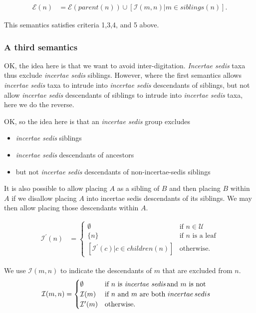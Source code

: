 \documentclass[english]{article}
\begin{document}
\begin{align*} 
\mathcal{E}(n) & =\mathcal{E}(parent(n))\cup\left[\mathcal{I}(m,n)\big|m\in siblings(n)\right].\label{eq:exclude-set-formula-1}
\end{align*}

This semantics satisfies criteria 1,3,4, and 5 above.

\subsubsection{A third semantics}

OK, the idea here is that we want to avoid inter-digitation.
\emph{Incertae sedis} taxa thus exclude\emph{ incertae sedis}
siblings. However, where the first semantics allows \emph{incertae
sedis }taxa to intrude into \emph{incertae sedis} descendants of
siblings, but not allow\emph{ incertae sedis} descendants of siblings
to intrude into \emph{incertae sedis} taxa, here we do the reverse.

OK, so the idea here is that an\emph{ incertae sedis} group excludes
\begin{itemize} \item \emph{incertae sedis} siblings \item
\emph{incertae sedis }descendants of ancestors \item but not\emph{
incertae sedis} descendants of non-incertae-sedis siblings
\end{itemize} It is also possible to allow placing $A$ as a sibling of
$B$ and then placing $B$ within $A$ if we disallow placing $A$ into
incertae sedis descendants of its siblings. We may then allow placing
those descendants within $A$.

\begin{align*} \mathcal{I^{\prime}}(n) & =\begin{cases} \emptyset &
\text{if }n\in\mathcal{U}\\ \{n\} & \text{if }n\text{ is a leaf}\\{}
[\mathcal{I}^{\prime}(c)|c\in children(n)] & \text{otherwise.}
\end{cases} \end{align*}

We use $\mathcal{I}(m,n)$ to indicate the descendants of $m$ that are
excluded from $n$. \begin{align*} \mathcal{I}(m,n) & =\begin{cases}
\emptyset & \text{if }n\text{ is \emph{incertae sedis}\,and }m\text{
is not}\\ \mathcal{I}(m) & \text{if }n\text{ and }m\text{ are both
}incertae\,sedis\\ \mathcal{I}^{\prime}(m) & \text{otherwise.}
\end{cases} \end{align*}
\end{document}
